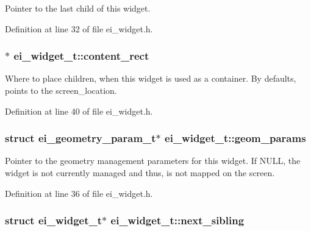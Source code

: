 Pointer to the last child of this widget. 



Definition at line 32 of file ei\+\_\+widget.\+h.

\hypertarget{structei__widget__t_a75c29d388a5f5b32cdd8a9c855bc2a75}{
\subsubsection[{content\+\_\+rect}]{$\ast$ ei\+\_\+widget\+\_\+t\+::content\+\_\+rect}}\label{structei__widget__t_a75c29d388a5f5b32cdd8a9c855bc2a75}


Where to place children, when this widget is used as a container. By defaults, points to the screen\+\_\+location. 



Definition at line 40 of file ei\+\_\+widget.\+h.

\hypertarget{structei__widget__t_a31885277c641803a931fff1d6256203f}{
\subsubsection[{geom\+\_\+params}]{\setlength{\rightskip}{0pt plus 5cm}struct {\bf ei\+\_\+geometry\+\_\+param\+\_\+t}$\ast$ ei\+\_\+widget\+\_\+t\+::geom\+\_\+params}}\label{structei__widget__t_a31885277c641803a931fff1d6256203f}


Pointer to the geometry management parameters for this widget. If N\+U\+L\+L, the widget is not currently managed and thus, is not mapped on the screen. 



Definition at line 36 of file ei\+\_\+widget.\+h.

\hypertarget{structei__widget__t_ada15cedaf8e6e104a1461c1754ff6cb3}{
\subsubsection[{next\+\_\+sibling}]{\setlength{\rightskip}{0pt plus 5cm}struct {\bf ei\+\_\+widget\+\_\+t}$\ast$ ei\+\_\+widget\+\_\+t\+::next\+\_\+sibling}}\label{structei__widget__t_ada15cedaf8e6e104a1461c1754ff6cb3}


